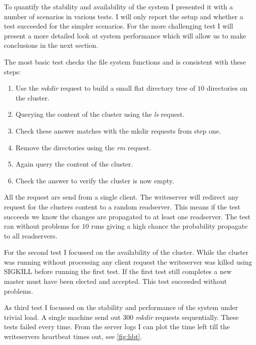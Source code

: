 To quantify the stability and availability of the system I presented it with a number of scenarios in various tests. I will only report the setup and whether a test succeeded for the simpler scenarios. For the more challenging test I will present a more detailed look at system performance which will allow us to make conclusions in the next section.

The most basic test checks the file system functions and is consistent with these steps: 
\begin{enumerate}
	\item Use the \textit{mkdir} request to build a small flat directory tree of $10$ directories on the cluster.
	\item Querying the content of the cluster using the \textit{ls} request. 
	\item Check these answer matches with the mkdir requests from step one.
	\item Remove the directories using the \textit{rm} request.
	\item Again query the content of the cluster.
	\item Check the answer to verify the cluster is now empty.
\end{enumerate}
All the request are send from a single client. The writeserver will redirect any request for the clusters content to a random readserver. This means if the test succeeds we know the changes are propagated to at least one readserver. The test ran without problems for $10$ runs giving a high chance the probability propagate to all readservers.

For the second test I focussed on the availability of the cluster. While the cluster was running without processing any client request the writeserver was killed using \textsc{SIGKILL} before running the first test. If the first test still completes a new master must have been elected and accepted. This test succeeded without problems.

As third test I focussed on the stability and performance of the system under trivial load. A single machine send out $300$ \textit{mkdir} requests sequentially. These tests failed every time. From the server logs I can plot the time left till the writeservers heartbeat times out, see \cref{fig:hbt}.

